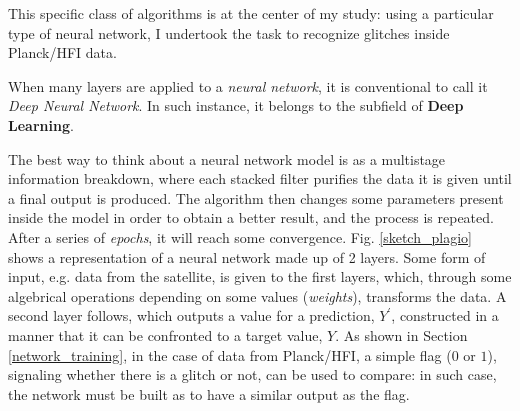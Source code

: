 \documentclass[12pt,a4paper,final]{book}			%
\begin{document}
			This specific class of algorithms is at the center of my study: using a particular type of neural network, I undertook the task to recognize glitches inside Planck/HFI data. 
			
			When many layers are applied to a \textit{neural network}, it is conventional to call it \textit{Deep Neural Network}. In such instance, it belongs to the subfield of \textbf{Deep Learning}.
			
			
			The best way to think about a neural network model is as a multistage information breakdown, where each stacked filter purifies the data it is given until a final output is produced. The algorithm then changes some parameters present inside the model in order to obtain a better result, and the process is repeated. After a series of \textit{epochs}, it will reach some convergence. Fig. \ref{sketch_plagio} shows a representation of a neural network made up of 2 layers. Some form of input, e.g. data from the satellite, is given to the first layers, which, through some algebrical operations depending on some values (\textit{weights}), transforms the data. A second layer follows, which outputs a value for a prediction, $Y^\prime$, constructed in a manner that it can be confronted to a target value, $Y$. As shown in Section \ref{network_training}, in the case of data from Planck/HFI, a simple flag ($0$ or $1$), signaling whether there is a glitch or not, can be used to compare: in such case, the network must be built as to have a similar output as the flag. 
			
\end{document}
